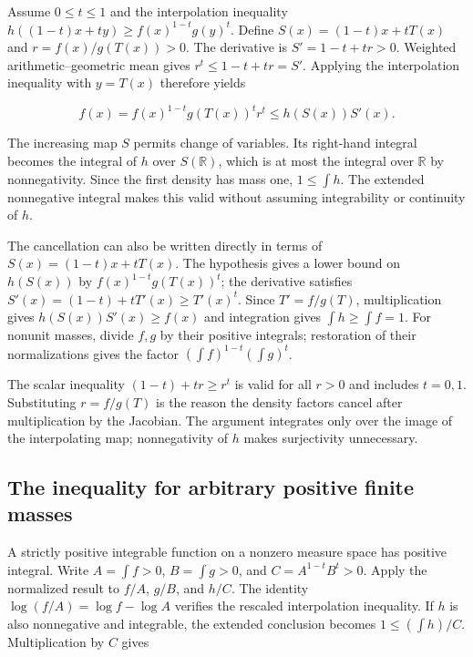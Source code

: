 \documentclass[11pt,a4paper]{article}
\begin{document}
Assume \(0\le t\le1\) and the interpolation inequality \(h((1-t)x+ty)\ge f(x)^{1-t}g(y)^t\). Define \(S(x)=(1-t)x+tT(x)\) and \(r=f(x)/g(T(x))>0\). The derivative is \(S'=1-t+tr>0\). Weighted arithmetic–geometric mean gives \(r^t\le1-t+tr=S'\). Applying the interpolation inequality with \(y=T(x)\) therefore yields

\[f(x)=f(x)^{1-t}g(T(x))^t r^t\le h(S(x))S'(x).\]

The increasing map \(S\) permits change of variables. Its right-hand integral becomes the integral of \(h\) over \(S(\mathbb R)\), which is at most the integral over \(\mathbb R\) by nonnegativity. Since the first density has mass one, \(1\le\int h\). The extended nonnegative integral makes this valid without assuming integrability or continuity of \(h\).



The cancellation can also be written directly in terms of \(S(x)=(1-t)x+tT(x)\). The hypothesis gives a lower bound on \(h(S(x))\) by \(f(x)^{1-t}g(T(x))^t\); the derivative satisfies \(S'(x)=(1-t)+tT'(x)\ge T'(x)^t\). Since \(T'=f/g(T)\), multiplication gives \(h(S(x))S'(x)\ge f(x)\) and integration gives \(\int h\ge\int f=1\). For nonunit masses, divide \(f,g\) by their positive integrals; restoration of their normalizations gives the factor \((\int f)^{1-t}(\int g)^t\).



The scalar inequality \((1-t)+tr\ge r^t\) is valid for all \(r>0\) and includes \(t=0,1\). Substituting \(r=f/g(T)\) is the reason the density factors cancel after multiplication by the Jacobian. The argument integrates only over the image of the interpolating map; nonnegativity of \(h\) makes surjectivity unnecessary.



\subsection{\texorpdfstring{The inequality for arbitrary positive finite masses}{The inequality for arbitrary positive finite masses}}


A strictly positive integrable function on a nonzero measure space has positive integral. Write \(A=\int f>0\), \(B=\int g>0\), and \(C=A^{1-t}B^t>0\). Apply the normalized result to \(f/A\), \(g/B\), and \(h/C\). The identity \(\log(f/A)=\log f-\log A\) verifies the rescaled interpolation inequality. If \(h\) is also nonnegative and integrable, the extended conclusion becomes \(1\le(\int h)/C\). Multiplication by \(C\) gives
\end{document}
